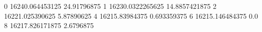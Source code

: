 0 16240.064453125 24.91796875
1 16230.0322265625 14.8857421875
2 16221.025390625 5.87890625
4 16215.83984375 0.693359375
6 16215.146484375 0.0
8 16217.826171875 2.6796875
